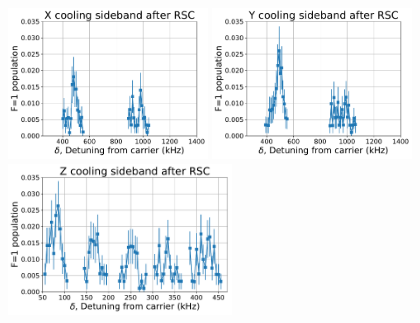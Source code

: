 \documentclass[aps,secnumarabic,amsmath,amssymb]{revtex4}
\begin{document}
\includegraphics[height=4cm]{spectrum_zoom_cool_rx.pdf}
\includegraphics[height=4cm]{spectrum_zoom_cool_ry.pdf}
\includegraphics[height=4cm]{spectrum_zoom_cool_az.pdf}


\end{document}

